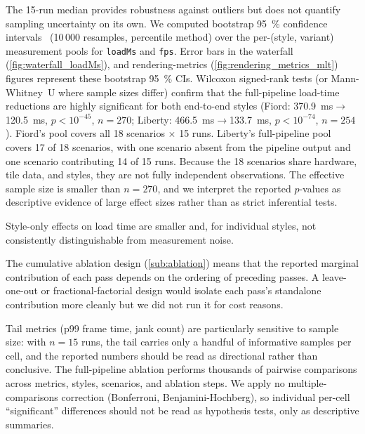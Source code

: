 The 15-run median provides robustness against outliers but does not quantify sampling uncertainty on its own.
We computed bootstrap \qty{95}{\percent} confidence intervals~\cite{efronIntroductionBootstrap1998} (10\,000 resamples, percentile method) over the per-(style, variant) measurement pools for \texttt{loadMs} and \texttt{fps}.
Error bars in the waterfall (\cref{fig:waterfall_loadMs}), and rendering-metrics (\cref{fig:rendering_metrics_mlt}) figures represent these bootstrap \qty{95}{\percent} CIs.
Wilcoxon signed-rank tests (or Mann-Whitney~U where sample sizes differ) confirm that the full-pipeline load-time reductions are highly significant for both end-to-end styles (Fiord: \qty{370.9}{\milli\second}$\to$\qty{120.5}{\milli\second}, $p < 10^{-45}$, $n = 270$; Liberty: \qty{466.5}{\milli\second}$\to$\qty{133.7}{\milli\second}, $p < 10^{-74}$, $n = 254$).
Fiord's pool covers all 18 scenarios $\times$ 15 runs.
Liberty's full-pipeline pool covers 17 of 18 scenarios, with one scenario absent from the pipeline output and one scenario contributing 14 of 15 runs.
Because the 18 scenarios share hardware, tile data, and styles, they are not fully independent observations.
The effective sample size is smaller than $n = 270$, and we interpret the reported $p$-values as descriptive evidence of large effect sizes rather than as strict inferential tests.

Style-only effects on load time are smaller and, for individual styles, not consistently distinguishable from measurement noise.

The cumulative ablation design (\cref{sub:ablation}) means that the reported marginal contribution of each pass depends on the ordering of preceding passes.
A leave-one-out or fractional-factorial design would isolate each pass's standalone contribution more cleanly but we did not run it for cost reasons.

Tail metrics (p99 frame time, jank count) are particularly sensitive to sample size: with $n=15$ runs, the tail carries only a handful of informative samples per cell, and the reported numbers should be read as directional rather than conclusive.
The full-pipeline ablation performs thousands of pairwise comparisons across metrics, styles, scenarios, and ablation steps.
We apply no multiple-comparisons correction (Bonferroni, Benjamini-Hochberg), so individual per-cell \enquote{significant} differences should not be read as hypothesis tests, only as descriptive summaries.

